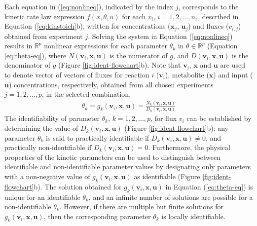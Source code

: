 \documentclass[10pt]{article}
\begin{document}
	Each equation in (\ref{eq:nonlineq}), indicated by the index $j$, corresponds to the kinetic rate law expression $f(x, \theta, u)$ for each $v_i$, $i={1, 2, ..., n_r}$, described in Equation (\ref{eq:kinstoich}b), written for concentrations ($\mathbf{x}_j$, $\mathbf{u}_j$) and fluxes ($v_{i,j}$) obtained from experiment $j$. Solving the system in Equation (\ref{eq:nonlineq}) results in $\mathbb{R}^p$ nonlinear expressions for each parameter $\theta_k$ in $\theta \in \mathbb{R}^p$ (Equation \ref{eq:theta-eq}), where $N(\mathbf{v}_i, \mathbf{x}, \mathbf{u})$ is the numerator of $g$, and $D(\mathbf{v}_i, \mathbf{x}, \mathbf{u})$ is the denominator of $g$ (Figure \ref{fig:ident-flowchart}b). Note that $\mathbf{v}_i$, $\mathbf{x}$ and $\mathbf{u}$ are used to denote vector of vectors of fluxes for reaction $i$ ($\mathbf{v}_i$), metabolite ($\mathbf{x}$) and input ($\mathbf{u}$) concentrations, respectively, obtained from all chosen experiments $j = {1, 2, ..., p}$, in the selected combination.
	\begin{align}\label{eq:theta-eq}
	\theta_k = g_k(\mathbf{v}_i, \mathbf{x}, \mathbf{u}) = \frac{N_k(\mathbf{v}_i, \mathbf{x}, \mathbf{u})}{D_k(\mathbf{v}_i, \mathbf{x}, \mathbf{u})}
	\end{align}
	The identifiability of parameter $\theta_k$, $k = {1, 2, ..., p}$, for flux $v_i$ can be established by determining the value of $D_k(\mathbf{v}_i, \mathbf{x}, \mathbf{u})$ (Figure \ref{fig:ident-flowchart}b): any parameter $\theta_k$ is said to practically identifiable if $D_k(\mathbf{v}_i, \mathbf{x}, \mathbf{u})\neq0$, and practically non-identifiable if $D_k(\mathbf{v}_i, \mathbf{x}, \mathbf{u}) = 0$. Furthermore, the physical properties of the kinetic parameters can be used to distinguish between identifiable and non-identifiable parameter values by designating only parameters with a non-negative value of $g_k(\mathbf{v}_i, \mathbf{x}, \mathbf{u})$ as identifiable (Figure \ref{fig:ident-flowchart}b). The solution obtained for $g_k(\mathbf{v}_i, \mathbf{x}, \mathbf{u})$ in Equation (\ref{eq:theta-eq}) is unique for an identifiable $\theta_k$, and an infinite number of solutions are possible for a non-identifiable $\theta_k$. However, if there are multiple but finite solutions for $g_k(\mathbf{v}_i, \mathbf{x}, \mathbf{u})$, then the corresponding parameter $\theta_k$ is locally identifiable.
	
	
\end{document}
